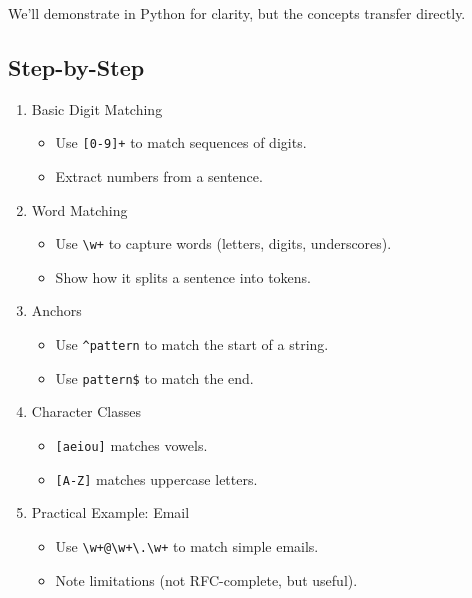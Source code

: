 \documentclass[
  letterpaper,
  DIV=11,
  numbers=noendperiod]{scrreprt}
\providecommand{\tightlist}{%
  \setlength{\itemsep}{0pt}\setlength{\parskip}{0pt}}
\begin{document}
We'll demonstrate in Python for clarity, but the concepts transfer
directly.

\subsection{Step-by-Step}\label{step-by-step-4}

\begin{enumerate}
\def\labelenumi{\arabic{enumi}.}
\item
  Basic Digit Matching

  \begin{itemize}
  \tightlist
  \item
    Use \texttt{{[}0-9{]}+} to match sequences of digits.
  \item
    Extract numbers from a sentence.
  \end{itemize}
\item
  Word Matching

  \begin{itemize}
  \tightlist
  \item
    Use \texttt{\textbackslash{}w+} to capture words (letters, digits,
    underscores).
  \item
    Show how it splits a sentence into tokens.
  \end{itemize}
\item
  Anchors

  \begin{itemize}
  \tightlist
  \item
    Use \texttt{\^{}pattern} to match the start of a string.
  \item
    Use \texttt{pattern\$} to match the end.
  \end{itemize}
\item
  Character Classes

  \begin{itemize}
  \tightlist
  \item
    \texttt{{[}aeiou{]}} matches vowels.
  \item
    \texttt{{[}A-Z{]}} matches uppercase letters.
  \end{itemize}
\item
  Practical Example: Email

  \begin{itemize}
  \tightlist
  \item
    Use
    \texttt{\textbackslash{}w+@\textbackslash{}w+\textbackslash{}.\textbackslash{}w+}
    to match simple emails.
  \item
    Note limitations (not RFC-complete, but useful).
  \end{itemize}
\end{enumerate}
\end{document}
